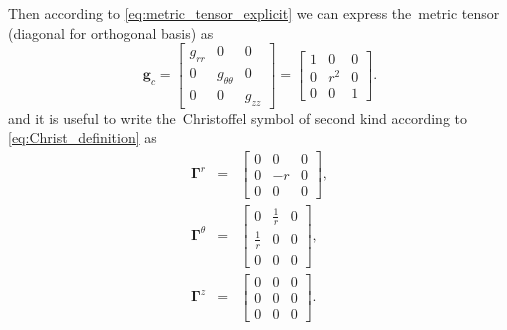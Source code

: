 \documentclass[preprint,12pt]{elsarticle}
\newcommand{\matr}[1]{\mathbf{#1}}
\begin{document}
Then according to \eqref{eq:metric_tensor_explicit} we can express the~metric
tensor (diagonal for orthogonal basis) as
\begin{equation}
  \matr{g}_c = \begin{bmatrix}
                 g_{rr} & 0 & 0 \\
			     0 & g_{\theta\theta} & 0 \\
			     0 & 0 & g_{zz}
			   \end{bmatrix}
             = \begin{bmatrix}
                 1 & 0 & 0 \\
			     0 & r^2 & 0 \\
			     0 & 0 & 1
			   \end{bmatrix} .
  \label{eq:cyl_metric_tensor}		   
\end{equation}
and it is useful to write the~Christoffel symbol of second kind according to
\eqref{eq:Christ_definition} as
\begin{eqnarray}
  \matr{\Gamma}^r &=& 
    \begin{bmatrix}
	  0 & 0 & 0 \\
	  0 & -r & 0 \\
	  0 & 0 & 0
    \end{bmatrix} ,
  \nonumber \\
  \matr{\Gamma}^\theta &=& 
    \begin{bmatrix}
      0 & \frac{1}{r} & 0 \\
      \frac{1}{r} & 0 & 0 \\ 
	  0 & 0 & 0
    \end{bmatrix} ,
  \label{eq:Christ_cylindr}\\
  \matr{\Gamma}^z &=& 
    \begin{bmatrix}
	  0 & 0& 0 \\
	  0 & 0 & 0 \\
	  0 & 0 & 0
    \end{bmatrix} .
  \nonumber
\end{eqnarray}
\end{document}
